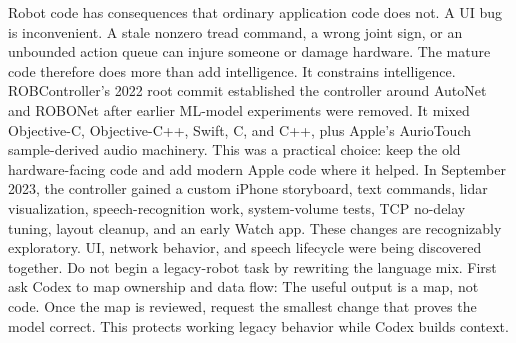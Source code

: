 {}Robot code has consequences that ordinary application code does not. A UI bug\markdownRendererSoftLineBreak
{}is inconvenient. A stale nonzero tread command, a wrong joint sign, or an\markdownRendererSoftLineBreak
{}unbounded action queue can injure someone or damage hardware. The mature code\markdownRendererSoftLineBreak
{}therefore does more than add intelligence. It constrains intelligence.\markdownRendererInterblockSeparator
{}\markdownRendererThematicBreak{}\markdownRendererInterblockSeparator
{}
\markdownRendererSectionEnd \markdownRendererSectionBegin
{}\markdownRendererInterblockSeparator
{}ROBController's 2022 root commit established the controller around AutoNet and\markdownRendererSoftLineBreak
{}ROBONet after earlier ML-model experiments were removed. It mixed Objective-C,\markdownRendererSoftLineBreak
{}Objective-C++, Swift, C, and C++, plus Apple's AurioTouch sample-derived audio\markdownRendererSoftLineBreak
{}machinery. This was a practical choice: keep the old hardware-facing code and\markdownRendererSoftLineBreak
{}add modern Apple code where it helped.\markdownRendererParagraphSeparator
{}In September 2023, the controller gained a custom iPhone storyboard, text\markdownRendererSoftLineBreak
{}commands, lidar visualization, speech-recognition work, system-volume tests,\markdownRendererSoftLineBreak
{}TCP no-delay tuning, layout cleanup, and an early Watch app. These changes are\markdownRendererSoftLineBreak
{}recognizably exploratory. UI, network behavior, and speech lifecycle were\markdownRendererSoftLineBreak
{}being discovered together.\markdownRendererInterblockSeparator
{}\markdownRendererSectionBegin
{}\markdownRendererInterblockSeparator
{}Do not begin a legacy-robot task by rewriting the language mix. First ask Codex\markdownRendererSoftLineBreak
{}to map ownership and data flow:\markdownRendererInterblockSeparator
{}\markdownRendererInterblockSeparator
{}The useful output is a map, not code. Once the map is reviewed, request the\markdownRendererSoftLineBreak
{}smallest change that proves the model correct. This protects working legacy\markdownRendererSoftLineBreak
{}behavior while Codex builds context.\markdownRendererInterblockSeparator
{}\markdownRendererThematicBreak{}\markdownRendererInterblockSeparator
{}
\markdownRendererSectionEnd 
